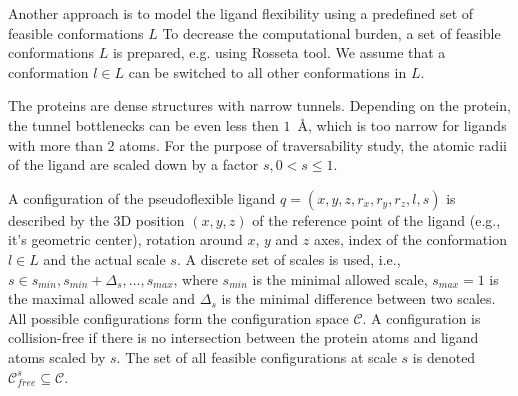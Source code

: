 \documentclass{svmult}
\def\C{\mathcal{C}}
\def\CFD{{\mathcal{C}^s_{free}}}
\def\smin{s_{min}}
\def\smax{s_{max}}
\def\sdelta{{\Delta}_s}
\def\L{L}
\begin{document}


Another approach is to model the ligand flexibility using a predefined set of feasible conformations $\L$
To decrease the computational burden, a set of feasible conformations $\L$ is prepared, e.g. using Rosseta tool.
We assume that a conformation $l \in \L$ can be switched to all other conformations in $\L$.

The proteins are dense structures with narrow tunnels.
Depending on the protein, the tunnel bottlenecks can be even less then $1$~\AA, which is too narrow for ligands with more than 2 atoms.
For the purpose of traversability study, the atomic radii of the ligand are scaled down by a factor $s, 0 < s \le 1$.

A configuration of the pseudoflexible ligand $q=(x,y,z,r_x,r_y,r_z,l,s)$  is described
by the 3D position $(x,y,z)$ of the reference point of the ligand (e.g., it's geometric center), rotation around $x$, $y$ and $z$ axes,
index of the conformation $l\in \L$ and the actual scale $s$.
A discrete set of scales is used, i.e., $s \in {\smin, \smin+\sdelta, \ldots, \smax}$, where 
$\smin$ is the minimal allowed scale, $\smax=1$ is the maximal allowed scale and $\sdelta$ is the minimal difference between two scales.
All possible configurations form the configuration space $\C$. 
A configuration is collision-free if there is no intersection between the protein atoms and ligand atoms scaled by $s$.
The set of all feasible configurations at scale $s$ is denoted $\CFD \subseteq \C$.
\end{document}
